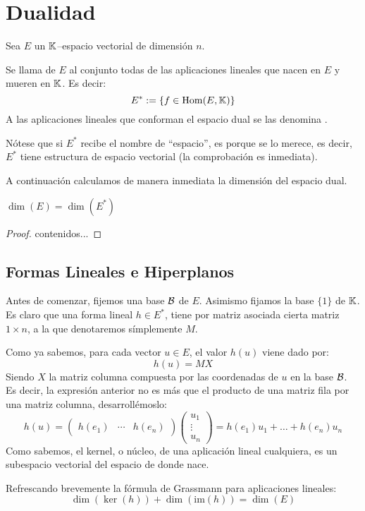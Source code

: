 \section{Dualidad}
Sea $E$ un $\mathbb{K}$--espacio vectorial de dimensión $n$.
\begin{defi}
	Se llama  de $E$ al conjunto todas de las aplicaciones lineales que nacen en $E$ y mueren en $\mathbb{K}$. Es decir:
	\[E^*:=\{f\in\mathrm{Hom}(E,\mathbb{K})\}\]
	A las aplicaciones lineales que conforman el espacio dual se las denomina .
\end{defi}
Nótese que si $E^*$ recibe el nombre de ``espacio'', es porque se lo merece, es decir, $E^*$ tiene estructura de espacio vectorial (la comprobación es inmediata).

A continuación calculamos de manera inmediata la dimensión del espacio dual.
\begin{lem}
	$\dim(E)=\dim(E^*)$
\end{lem}
\begin{proof}
	contenidos...
\end{proof}
\subsection{Formas Lineales e Hiperplanos}
Antes de comenzar, fijemos una base $\mathcal{B}$ de $E$. Asimismo fijamos la base $\{1\}$ de $\mathbb{K}$. Es claro que una forma lineal $h\in E^*$, tiene por matriz asociada cierta matriz $1\times n$, a la que denotaremos símplemente $M$.

Como ya sabemos, para cada vector $u\in E$, el valor $h(u)$ viene dado por:
\[h(u)=MX\]
Siendo $X$ la matriz columna compuesta por las coordenadas de $u$ en la base $\mathcal{B}$. Es decir, la expresión anterior no es más que el producto de una matriz fila por una matriz columna, desarrollémoslo:
\[h(u)=\begin{pmatrix}
h(e_1) & \cdots & h(e_n)
\end{pmatrix}\begin{pmatrix}
u_1\\
\vdots\\
u_n
\end{pmatrix}=h(e_1)u_1+\dots+h(e_n)u_n\]
Como sabemos, el kernel, o núcleo, de una aplicación lineal cualquiera, es un subespacio vectorial del espacio de donde nace.

Refrescando brevemente la fórmula de Grassmann para aplicaciones lineales:
\[\dim(\ker(h))+\dim(\mathrm{im}(h))=\dim(E)\]

